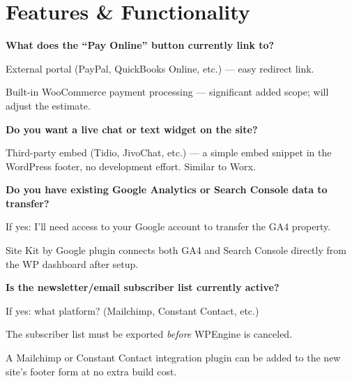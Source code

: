 \documentclass[11pt, letterpaper]{article}
\begin{document}
\section{Features \& Functionality}

\begin{checklist}
  \item \textbf{What does the ``Pay Online'' button currently link to?}
    \begin{checklist}
      \item External portal (PayPal, QuickBooks Online, etc.) --- easy redirect link.
      \item Built-in WooCommerce payment processing --- significant added scope;
            will adjust the estimate.
    \end{checklist}

  \item \textbf{Do you want a live chat or text widget on the site?}
    \begin{checklist}
      \item Third-party embed (Tidio, JivoChat, etc.) --- a simple embed snippet
            in the WordPress footer, no development effort. Similar to Worx.
    \end{checklist}

  \item \textbf{Do you have existing Google Analytics or Search Console data
        to transfer?}
    \begin{checklist}
      \item If yes: I'll need access to your Google account to transfer the GA4 property.
      \item Site Kit by Google plugin connects both GA4 and Search Console
            directly from the WP dashboard after setup.
    \end{checklist}

  \item \textbf{Is the newsletter/email subscriber list currently active?}
    \begin{checklist}
      \item If yes: what platform? (Mailchimp, Constant Contact, etc.)
      \item The subscriber list must be exported \emph{before} WPEngine is canceled.
      \item A Mailchimp or Constant Contact integration plugin can be added to the
            new site's footer form at no extra build cost.
    \end{checklist}


\end{checklist}
\end{document}
